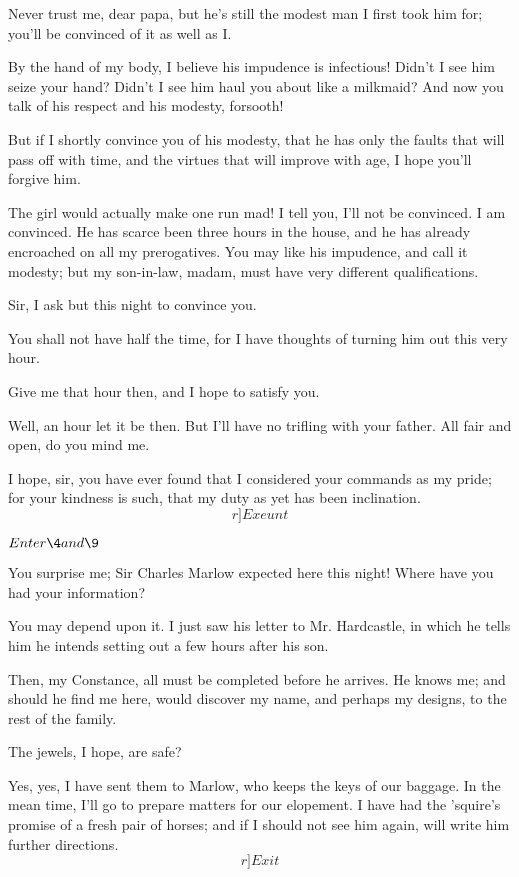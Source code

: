 \documentclass{book}
\begin{document}
\8  Never trust me, dear papa, but he's still the modest
man I first took him for; you'll be convinced of it as well as I.

\3  By the hand of my body, I believe his impudence is
infectious!  Didn't I see him seize your hand?  Didn't I see him haul
you about like a milkmaid?  And now you talk of his respect and his
modesty, forsooth!

\8  But if I shortly convince you of his modesty, that he
has only the faults that will pass off with time, and the virtues that
will improve with age, I hope you'll forgive him.

\3  The girl would actually make one run mad!  I tell you,
I'll not be convinced.  I am convinced.  He has scarce been three hours
in the house, and he has already encroached on all my prerogatives. 
You may like his impudence, and call it modesty; but my son-in-law,
madam, must have very different qualifications.

\8  Sir, I ask but this night to convince you.

\3  You shall not have half the time, for I have thoughts of
turning him out this very hour.

\8  Give me that hour then, and I hope to satisfy you.

\3  Well, an hour let it be then.  But I'll have no trifling
with your father.  All fair and open, do you mind me.

\8  I hope, sir, you have ever found that I considered
your commands as my pride; for your kindness is such, that my duty as
yet has been inclination.  \[r]Exeunt\]



\Act


\(Enter \4 and \9\)


\4  You surprise me; Sir Charles Marlow expected here this
night!  Where have you had your information?

\9  You may depend upon it.  I just saw his letter to Mr.
Hardcastle, in which he tells him he intends setting out a few hours
after his son.

\4  Then, my Constance, all must be completed before he
arrives.  He knows me; and should he find me here, would discover my
name, and perhaps my designs, to the rest of the family.

\9  The jewels, I hope, are safe?

\4  Yes, yes, I have sent them to Marlow, who keeps the keys of
our baggage.  In the mean time, I'll go to prepare matters for our
elopement.  I have had the 'squire's promise of a fresh pair of horses;
and if I should not see him again, will write him further directions. 
\[r]Exit\]
\end{document}
